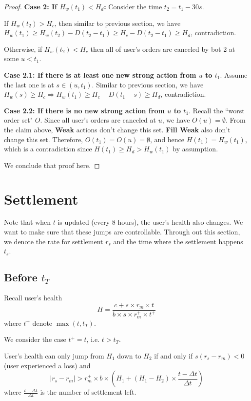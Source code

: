 \documentclass[notitlepage,reqno,11pt]{amsart}
\numberwithin{equation}{section}
\newcommand{\RA}{\Rightarrow}
\begin{document}
\begin{proof}
\textbf{Case 2: If $H_w(t_1) < H_d$:} Consider the time $t_2 = t_1 - 30s$. 

If $H_w(t_2) > H_c$, then similar to previous section, we have $H_w(t_1) \geq H_w(t_2) - D(t_2-t_1) \geq H_c - D(t_2-t_1) \geq H_d$, contradiction.

Otherwise, if $H_w(t_2) < H_c$ then all of user's orders are canceled by bot 2 at some $u < t_1$. 

\textbf{Case 2.1: If there is at least one new strong action from $u$ to $t_1$}. Assume the last one is at $s\in(u,t_1)$. Similar to previous section, we have $H_w(s) \geq H_c\RA H_w(t_1) \geq H_c - D(t_1-s) \geq H_d$, contradiction.

\textbf{Case 2.2: If there is no new strong action from $u$ to $t_1$}. Recall the ``worst order set" $O$. Since all user's orders are canceled at $u$, we have $O(u) = \emptyset$. From the claim above, \textbf{Weak} actions don't change this set. \textbf{Fill Weak} also don't change this set. Therefore, $O(t_1) = O(u) = \emptyset$, and hence $H(t_1) = H_w(t_1)$, which is a contradiction since $H(t_1) \geq H_d > H_w(t_1)$ by assumption.

We conclude that proof here.

\end{proof}

\newpage


\section{Settlement}

Note that when $t$ is updated (every 8 hours), the user's health also changes. We want to make sure that these jumps are controllable. Through out this section, we denote the rate for settlement $r_s$ and the time where the settlement happens $t_s$. 
\subsection{Before $t_T$}

Recall user's health 
$$
H = \frac{c + s\times r_m\times t}{b\times s\times r_m^+\times t^+}
$$
where $t^+$ denote $\max(t, t_T)$. 

We consider the case $t^+ = t$, i.e. $t > t_T$. 

User's health can only jump from $H_1$ down to $H_2$ if and only if $s(r_s-r_m) < 0$ (user experienced a loss) and 
$$
|r_s - r_m| > r_m^+\times b\times (H_1 + (H_1-H_2)\times\frac{t-\Delta t}{\Delta t})
$$
where $\frac{t-\Delta t}{\Delta t}$ is the number of settlement left. 
\end{document}
